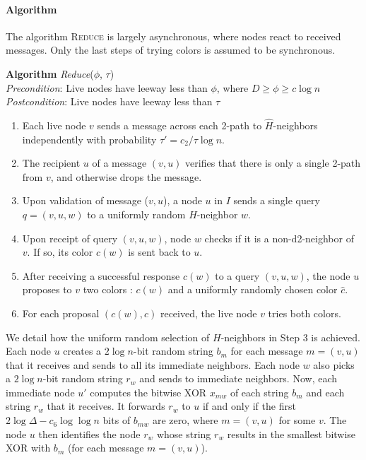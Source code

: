 \documentclass[12pt,a4]{article}
\newcommand{\alg}[1]{\textsc{#1}}
\begin{document}
\paragraph*{Algorithm} The algorithm \alg{Reduce} is largely asynchronous, where nodes react to received messages. Only the last steps of trying colors is assumed to be synchronous.
%
\bigskip

   \textbf{Algorithm} \emph{Reduce}($\phi$, $\tau$) \\
    \emph{Precondition}: Live nodes have leeway less than $\phi$, where $D \ge \phi \ge c\log n$ \\
    \emph{Postcondition}: Live nodes have leeway less than $\tau$


\begin{enumerate}[nosep]
  \item Each live node $v$ sends a message across each 2-path to $\hat{H}$-neighbors independently with probability $\tau' = c_2/\tau \log n$.
  \item The recipient $u$ of a message $(v,u)$ verifies that there is only a single 2-path from $v$, and otherwise drops the message.
  \item Upon validation of message ($v,u$), a node $u$ in $I$ sends a single query $q=(v,u,w)$ to a uniformly random $H$-neighbor $w$.
  \item Upon receipt of query $(v,u,w)$, node $w$ checks if it is a non-d2-neighbor of $v$. If so, its color $c(w)$ is sent back to $u$.
  \item After receiving a successful response $c(w)$ to a query $(v,u,w)$, the node $u$ proposes to $v$ two colors : $c(w)$ and a uniformly randomly chosen color $\hat{c}$.
  \item For each proposal $(c(w),\hat{c})$ received, the live node $v$ tries both colors.
  \end{enumerate}
\bigskip

We detail how the uniform random selection of $H$-neighbors in Step 3 is achieved. Each node $u$ creates a $2\log n$-bit random string $b_m$ for each message $m=(v,u)$ that it receives and sends to all its immediate neighbors. Each node $w$ also picks a $2\log n$-bit random string $r_w$ and sends to immediate neighbors. Now, each immediate node $u'$ computes the bitwise XOR $x_{mw}$ of each string $b_m$ and each string $r_w$ that it receives. It forwards $r_w$ to $u$ if and only if the first $2\log \Delta - c_6 \log\log n$ bits of $b_{mw}$ are zero, where $m=(v,u)$ for some $v$. The node $u$ then identifies the node $r_w$ whose string $r_w$ results in the smallest bitwise XOR with $b_m$ (for each message $m=(v,u)$).
\end{document}
